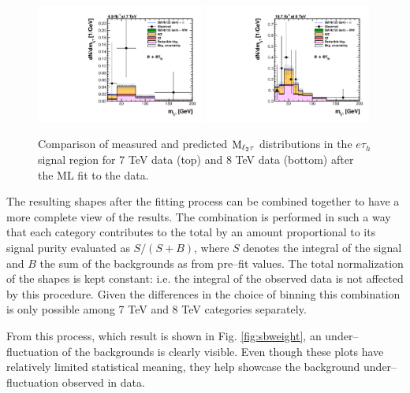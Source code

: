 \begin{figure}
\begin{center}
  \includegraphics[width=0.49\textwidth]{4_Analisys/pics/postfit/eet_postfit_7TeV_FitAllChannels.pdf}
  \includegraphics[width=0.49\textwidth]{4_Analisys/pics/postfit/eet_postfit_8TeV_FitAllChannels.pdf}\\
  \caption{Comparison of measured and predicted $\rm{M}_{\ell_2\tau}$ distributions in the $e\tau_h$ signal region for 7 TeV data (top) and 8 TeV data (bottom) after the ML fit to the data.}
  \label{fig:LLT_eet_postfit}
\end{center}
\end{figure}

The resulting shapes after the fitting process can be combined together to have a more complete view of the results. The combination is performed in such a way that each category contributes to the total by an amount proportional to its signal purity evaluated as $S / (S+B)$, where $S$ denotes the integral of the signal and $B$ the sum of the backgrounds as from pre--fit values. The total normalization of the shapes is kept constant: i.e. the integral of the observed data is not affected by this procedure. Given the differences in the choice of binning this combination is only possible among 7 TeV and 8 TeV categories separately. 

From this process, which result is shown in Fig. \ref{fig:sbweight}, an under--fluctuation of the backgrounds is clearly visible.
Even though these plots have relatively limited statistical meaning, they help showcase the background under--fluctuation observed in data.

